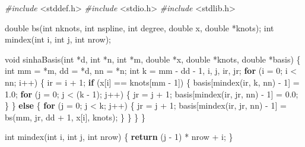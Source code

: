 \documentclass[
  12pt,
]{article}
\newenvironment{Shaded}{\begin{snugshade}}{\end{snugshade}}
\newcommand{\ControlFlowTok}[1]{\textcolor[rgb]{0.13,0.29,0.53}{\textbf{#1}}}
\newcommand{\DataTypeTok}[1]{\textcolor[rgb]{0.13,0.29,0.53}{#1}}
\newcommand{\DecValTok}[1]{\textcolor[rgb]{0.00,0.00,0.81}{#1}}
\newcommand{\FloatTok}[1]{\textcolor[rgb]{0.00,0.00,0.81}{#1}}
\newcommand{\ImportTok}[1]{#1}
\newcommand{\NormalTok}[1]{#1}
\newcommand{\PreprocessorTok}[1]{\textcolor[rgb]{0.56,0.35,0.01}{\textit{#1}}}
\begin{document}
\begin{Shaded}
\begin{Highlighting}[]
\PreprocessorTok{\#include }\ImportTok{\textless{}stddef.h\textgreater{}}
\PreprocessorTok{\#include }\ImportTok{\textless{}stdio.h\textgreater{}}
\PreprocessorTok{\#include }\ImportTok{\textless{}stdlib.h\textgreater{}}

\DataTypeTok{double}\NormalTok{ bs(}\DataTypeTok{int}\NormalTok{ nknots, }\DataTypeTok{int}\NormalTok{ nspline, }\DataTypeTok{int}\NormalTok{ degree, }\DataTypeTok{double}\NormalTok{ x, }\DataTypeTok{double}\NormalTok{ *knots);}
\DataTypeTok{int}\NormalTok{ mindex(}\DataTypeTok{int}\NormalTok{ i, }\DataTypeTok{int}\NormalTok{ j, }\DataTypeTok{int}\NormalTok{ nrow);}

\DataTypeTok{void}\NormalTok{ sinhaBasis(}\DataTypeTok{int}\NormalTok{ *d, }\DataTypeTok{int}\NormalTok{ *n, }\DataTypeTok{int}\NormalTok{ *m, }\DataTypeTok{double}\NormalTok{ *x, }\DataTypeTok{double}\NormalTok{ *knots,}
                \DataTypeTok{double}\NormalTok{ *basis) \{}
    \DataTypeTok{int}\NormalTok{ mm = *m, dd = *d, nn = *n;}
    \DataTypeTok{int}\NormalTok{ k = mm {-} dd {-} }\DecValTok{1}\NormalTok{, i, j, ir, jr;}
    \ControlFlowTok{for}\NormalTok{ (i = }\DecValTok{0}\NormalTok{; i \textless{} nn; i++) \{}
\NormalTok{        ir = i + }\DecValTok{1}\NormalTok{;}
        \ControlFlowTok{if}\NormalTok{ (x[i] == knots[mm {-} }\DecValTok{1}\NormalTok{]) \{}
\NormalTok{            basis[mindex(ir, k, nn) {-} }\DecValTok{1}\NormalTok{] = }\FloatTok{1.0}\NormalTok{;}
            \ControlFlowTok{for}\NormalTok{ (j = }\DecValTok{0}\NormalTok{; j \textless{} (k {-} }\DecValTok{1}\NormalTok{); j++) \{}
\NormalTok{                jr = j + }\DecValTok{1}\NormalTok{;}
\NormalTok{                basis[mindex(ir, jr, nn) {-} }\DecValTok{1}\NormalTok{] = }\FloatTok{0.0}\NormalTok{;}
\NormalTok{            \}}
\NormalTok{        \} }\ControlFlowTok{else}\NormalTok{ \{}
            \ControlFlowTok{for}\NormalTok{ (j = }\DecValTok{0}\NormalTok{; j \textless{} k; j++) \{}
\NormalTok{                jr = j + }\DecValTok{1}\NormalTok{;}
\NormalTok{                basis[mindex(ir, jr, nn) {-} }\DecValTok{1}\NormalTok{] = bs(mm, jr, dd + }\DecValTok{1}\NormalTok{, x[i], knots);}
\NormalTok{            \}}
\NormalTok{        \}}
\NormalTok{    \}}
\NormalTok{\}}

\DataTypeTok{int}\NormalTok{ mindex(}\DataTypeTok{int}\NormalTok{ i, }\DataTypeTok{int}\NormalTok{ j, }\DataTypeTok{int}\NormalTok{ nrow) \{ }\ControlFlowTok{return}\NormalTok{ (j {-} }\DecValTok{1}\NormalTok{) * nrow + i; \}}


\end{Highlighting}
\end{Shaded}
\end{document}
